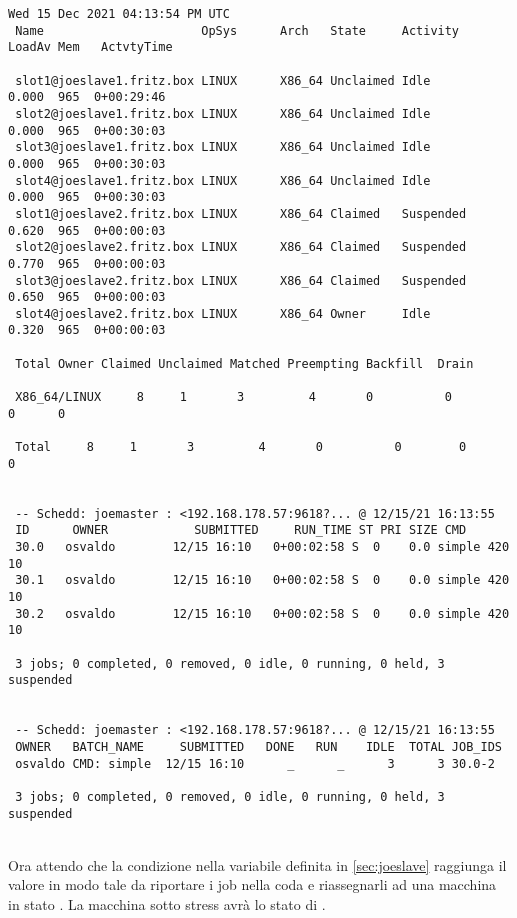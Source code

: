 \begin{lstlisting}[style=output_tiny]
 Wed 15 Dec 2021 04:13:54 PM UTC
 Name                      OpSys      Arch   State     Activity  LoadAv Mem   ActvtyTime
 
 slot1@joeslave1.fritz.box LINUX      X86_64 Unclaimed Idle       0.000  965  0+00:29:46
 slot2@joeslave1.fritz.box LINUX      X86_64 Unclaimed Idle       0.000  965  0+00:30:03
 slot3@joeslave1.fritz.box LINUX      X86_64 Unclaimed Idle       0.000  965  0+00:30:03
 slot4@joeslave1.fritz.box LINUX      X86_64 Unclaimed Idle       0.000  965  0+00:30:03
 slot1@joeslave2.fritz.box LINUX      X86_64 Claimed   Suspended  0.620  965  0+00:00:03
 slot2@joeslave2.fritz.box LINUX      X86_64 Claimed   Suspended  0.770  965  0+00:00:03
 slot3@joeslave2.fritz.box LINUX      X86_64 Claimed   Suspended  0.650  965  0+00:00:03
 slot4@joeslave2.fritz.box LINUX      X86_64 Owner     Idle       0.320  965  0+00:00:03
 
 Total Owner Claimed Unclaimed Matched Preempting Backfill  Drain
 
 X86_64/LINUX     8     1       3         4       0          0        0      0
 
 Total     8     1       3         4       0          0        0      0
 
 
 -- Schedd: joemaster : <192.168.178.57:9618?... @ 12/15/21 16:13:55
 ID      OWNER            SUBMITTED     RUN_TIME ST PRI SIZE CMD
 30.0   osvaldo        12/15 16:10   0+00:02:58 S  0    0.0 simple 420 10
 30.1   osvaldo        12/15 16:10   0+00:02:58 S  0    0.0 simple 420 10
 30.2   osvaldo        12/15 16:10   0+00:02:58 S  0    0.0 simple 420 10
 
 3 jobs; 0 completed, 0 removed, 0 idle, 0 running, 0 held, 3 suspended
 
 
 -- Schedd: joemaster : <192.168.178.57:9618?... @ 12/15/21 16:13:55
 OWNER   BATCH_NAME     SUBMITTED   DONE   RUN    IDLE  TOTAL JOB_IDS
 osvaldo CMD: simple  12/15 16:10      _      _      3      3 30.0-2
 
 3 jobs; 0 completed, 0 removed, 0 idle, 0 running, 0 held, 3 suspended
\end{lstlisting}
\ \\
Ora attendo che la condizione nella variabile  definita in \autoref{sec:joeslave} raggiunga il valore  in modo tale da riportare i job nella coda e riassegnarli ad una macchina in stato .
La macchina sotto stress avr\`{a} lo stato di .

